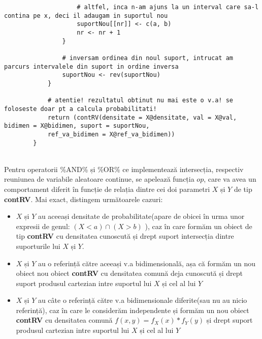 \documentclass[12pt]{article}
\begin{document}
\begin{lstlisting}
					# altfel, inca n-am ajuns la un interval care sa-l contina pe x, deci il adaugam in suportul nou
					suportNou[[nr]] <- c(a, b)
					nr <- nr + 1
				}
				
				# inversam ordinea din noul suport, intrucat am parcurs intervalele din suport in ordine inversa
				suportNou <- rev(suportNou)
			}
			
			# atentie! rezultatul obtinut nu mai este o v.a! se foloseste doar pt a calcula probabilitati!
			return (contRV(densitate = X@densitate, val = X@val, bidimen = X@bidimen, suport = suportNou,
			ref_va_bidimen = X@ref_va_bidimen))
		}
	\end{lstlisting}\vspace*{2\baselineskip}\\
	
	Pentru operatorii \%AND\% și \%OR\% ce implementează intersecția, respectiv reuniunea de variabile aleatoare continue, se apelează funcția $op$, care va avea un comportament diferit în funcție de relația dintre cei doi parametri $X$ și $Y$ de tip \textbf{contRV}. Mai exact, distingem următoarele cazuri:
	\begin{itemize}
		\item $X$ și $Y$ au aceeași densitate de probabilitate(apare de obicei în urma unor expresii de genul: $(X < a) \cap (X > b)$ ), caz în care formăm un obiect de tip \textbf{contRV} cu densitatea cunoscută și drept suport intersecția dintre suporturile lui $X$ și $Y$.
		\item $X$ și $Y$ au o referință către aceeași v.a bidimensională, așa că formăm un nou obiect nou obiect \textbf{contRV} cu densitatea comună deja cunoscută și drept suport produsul cartezian intre suportul lui $X$ și cel al lui $Y$
		\item $X$ și $Y$ au câte o referință către v.a bidimensionale diferite(sau nu au nicio referință), caz în care le considerăm independente și formăm un nou obiect \textbf{contRV} cu densitatea comună $f(x, y) = f_X(x) * f_Y(y)$ și drept suport produsul cartezian intre suportul lui $X$ și cel al lui $Y$		
	\end{itemize}
\end{document}
